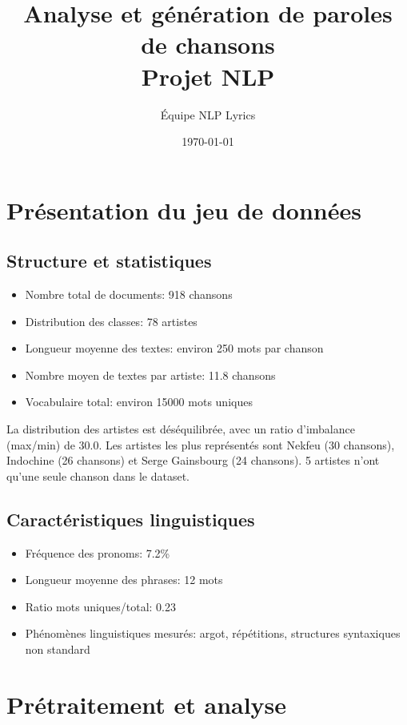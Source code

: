 \documentclass[a4paper,11pt]{article}
\title{\textbf{Analyse et génération de paroles de chansons\\
Projet NLP}}
\author{Équipe NLP Lyrics}
\date{\today}
\begin{document}
\maketitle

\section{Présentation du jeu de données}
\label{sec:dataset}

\subsection{Structure et statistiques}
\begin{itemize}
    \item Nombre total de documents: 918 chansons
    \item Distribution des classes: 78 artistes
    \item Longueur moyenne des textes: environ 250 mots par chanson
    \item Nombre moyen de textes par artiste: 11.8 chansons
    \item Vocabulaire total: environ 15000 mots uniques
\end{itemize}

La distribution des artistes est déséquilibrée, avec un ratio d'imbalance (max/min) de 30.0. Les artistes les plus représentés sont Nekfeu (30 chansons), Indochine (26 chansons) et Serge Gainsbourg (24 chansons). 5 artistes n'ont qu'une seule chanson dans le dataset.

\subsection{Caractéristiques linguistiques}
\begin{itemize}
    \item Fréquence des pronoms: 7.2\%
    \item Longueur moyenne des phrases: 12 mots
    \item Ratio mots uniques/total: 0.23
    \item Phénomènes linguistiques mesurés: argot, répétitions, structures syntaxiques non standard
\end{itemize}

\section{Prétraitement et analyse}
\label{sec:preprocessing}
\end{document}
